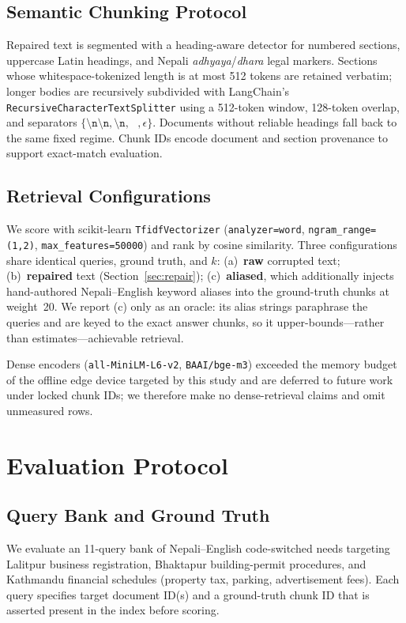 \documentclass[conference]{IEEEtran}
\begin{document}
\subsection{Semantic Chunking Protocol}
Repaired text is segmented with a heading-aware detector for numbered sections, uppercase Latin headings, and Nepali \emph{adhyaya}/\emph{dhara} legal markers. Sections whose whitespace-tokenized length is at most 512 tokens are retained verbatim; longer bodies are recursively subdivided with LangChain's \texttt{RecursiveCharacterTextSplitter} using a 512-token window, 128-token overlap, and separators $\{\texttt{\textbackslash n\textbackslash n},\texttt{\textbackslash n},\texttt{ },\epsilon\}$. Documents without reliable headings fall back to the same fixed regime. Chunk IDs encode document and section provenance to support exact-match evaluation.

\subsection{Retrieval Configurations}
We score with scikit-learn \texttt{TfidfVectorizer} (\texttt{analyzer=word}, \texttt{ngram\_range=(1,2)}, \texttt{max\_features=50000}) and rank by cosine similarity. Three configurations share identical queries, ground truth, and $k$:
(a)~\textbf{raw} corrupted text; (b)~\textbf{repaired} text (Section~\ref{sec:repair}); (c)~\textbf{aliased}, which additionally injects hand-authored Nepali--English keyword aliases into the ground-truth chunks at weight~20. We report (c) only as an oracle: its alias strings paraphrase the queries and are keyed to the exact answer chunks, so it upper-bounds---rather than estimates---achievable retrieval.

Dense encoders (\texttt{all-MiniLM-L6-v2}, \texttt{BAAI/bge-m3}) exceeded the memory budget of the offline edge device targeted by this study and are deferred to future work under locked chunk IDs; we therefore make no dense-retrieval claims and omit unmeasured rows.

\section{Evaluation Protocol}
\subsection{Query Bank and Ground Truth}
We evaluate an 11-query bank of Nepali--English code-switched needs targeting Lalitpur business registration, Bhaktapur building-permit procedures, and Kathmandu financial schedules (property tax, parking, advertisement fees). Each query specifies target document ID(s) and a ground-truth chunk ID that is asserted present in the index before scoring.
\end{document}
